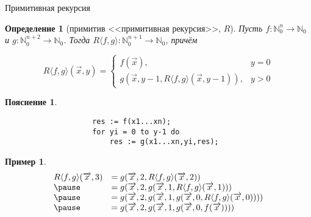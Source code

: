 \documentclass[aspectratio=169]{beamer}
\newtheorem{dfn}{Определение}[section]
\newtheorem{exm}{Пример}[section]
\newtheorem{snote}{Пояснение}[section]
\begin{document}
\begin{frame}[fragile]{Примитивная рекурсия}
\begin{dfn}[примитив <<примитивная рекурсия>>, $R$]
Пусть $f: \mathbb{N}^n_0\to\mathbb{N}_0$ и $g: \mathbb{N}^{n+2}_0 \to\mathbb{N}_0$.
Тогда $R\langle f,g\rangle: \mathbb{N}^{n+1}_0\to\mathbb{N}_0$, причём

$$R\langle f,g\rangle(\overrightarrow{x},y)=
 \left\{\begin{array}{ll} 
  f(\overrightarrow{x}), &y=0\\
  g(\overrightarrow{x},y-1,R\langle f,g\rangle (\overrightarrow{x},y-1)), &y > 0
\end{array}\right.$$
\end{dfn}\pause

\vspace{-0.3cm}
\begin{snote}\vspace{-0.5cm}
\begin{verbatim}
                    res := f(x1...xn);
                    for yi = 0 to y-1 do
                        res := g(x1...xn,yi,res);
\end{verbatim}
\end{snote}\pause

\vspace{-0.3cm}
\begin{exm}\vspace{-0.5cm}
$$\begin{array}{ll}
    R\langle f,g\rangle(\overrightarrow{x},3) &= g(\overrightarrow{x},2,R\langle f,g\rangle(\overrightarrow{x},2)) \\\pause
 &=   g(\overrightarrow{x},2,g(\overrightarrow{x},1,R\langle f,g\rangle(\overrightarrow{x},1))) \\\pause
 &=   g(\overrightarrow{x},2,g(\overrightarrow{x},1,g(\overrightarrow{x},0,R\langle f,g\rangle(\overrightarrow{x},0)))) \\\pause
 &=  g(\overrightarrow{x},2,g(\overrightarrow{x},1,g(\overrightarrow{x},0,f(\overrightarrow{x}))))
\end{array}$$
\end{exm}


\end{frame}
\end{document}
